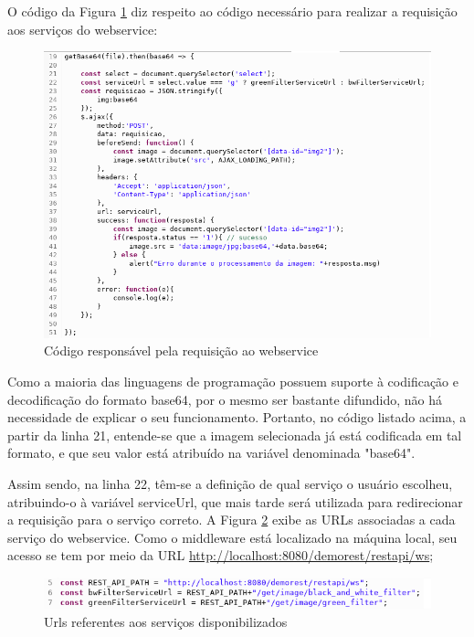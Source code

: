 \documentclass[12pt]{article}
\begin{document}
O código da Figura \ref{fig:Figura7} diz respeito ao código necessário para realizar a requisição aos serviços do webservice:

\begin{figure}[ht]
	\centering
	\includegraphics[width=.9\textwidth]{cliente-requisicao.png}
	\caption{Código responsável pela requisição ao webservice}
	\label{fig:Figura7}
\end{figure}

Como a maioria das linguagens de programação possuem suporte à codificação e decodificação do formato base64, por o mesmo ser bastante difundido, não há necessidade de explicar o seu funcionamento. Portanto, no código listado acima, a partir da linha 21, entende-se que a imagem selecionada já está codificada em tal formato, e que seu valor está atribuído na variável denominada "base64". 

Assim sendo, na linha 22, têm-se a definição de qual serviço o usuário escolheu, atribuindo-o à variável serviceUrl, que mais tarde será utilizada para redirecionar a requisição para o serviço correto. A Figura \ref{fig:Figura8} exibe as URLs associadas a cada serviço do webservice. Como o middleware está localizado na máquina local, seu acesso se tem por meio da URL \url{http://localhost:8080/demorest/restapi/ws}; 

\begin{figure}[ht]
	\centering
	\includegraphics[width=.9\textwidth]{caminho-servicos.png}
	\caption{Urls referentes aos serviços disponibilizados}
	\label{fig:Figura8}
\end{figure}
\end{document}
